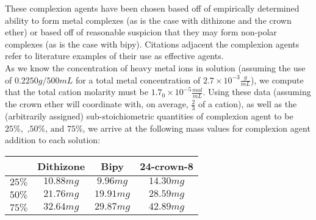 \documentclass[letterpaper,12pt]{article}
\begin{document}
	\indent
	These complexion agents have been chosen based off of empirically determined ability to form metal complexes (as is the case with dithizone and the crown ether) or based off of reasonable suspicion that they may form non-polar complexes (as is the case with bipy). Citations adjacent the complexion agents refer to literature examples of their use as effective agents.
	\\
	\indent
	As we know the concentration of heavy metal ions in solution (assuming the use of $0.2250g/500mL$ for a total metal concentration of $2.7\times 10^{-3}\frac{g}{mL}$), we compute that the total cation molarity must be $1.7_0\times 10^{-5}\frac{mol}{mL}$. Using these data (assuming the crown ether will coordinate with, on average, $\frac{2}{3}$ of a cation)\cite{c3}, as well as the (arbitrarily assigned) sub-stoichiometric quantities of complexion agent to be $25\%,\text{ ,}50\%\text{, and }75\%$, we arrive at the following mass values for complexion agent addition to each solution:
	\begin{center}
		\begin{tabular}[htbp]{r|c|c|c}
			& \textbf{Dithizone} & \textbf{Bipy} & \textbf{24-crown-8}\\
			\hline
			$25\%$ & $10.88mg$ & $9.96mg$ & $14.30mg$\\
			\hline 
			$50\%$ & $21.76mg$ & $19.91mg$ & $28.59mg$\\
			\hline
			$75\%$ & $32.64mg$ & $29.87mg$ & $42.89mg$
		\end{tabular}
	\end{center}
	
\end{document}
